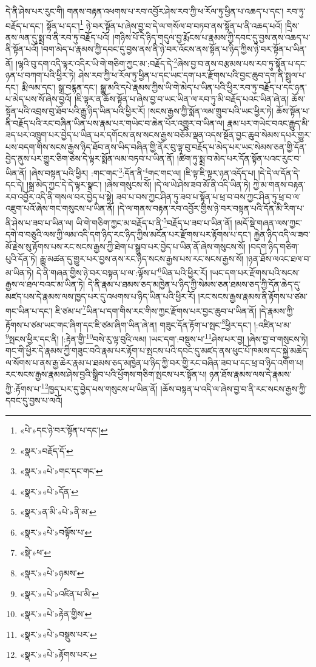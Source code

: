 དེ་ནི་ཤེས་པར་རུང་གི། གནས་བརྟན་འཕགས་པ་རབ་འབྱོར་ཤེས་རབ་ཀྱི་ཕ་རོལ་ཏུ་ཕྱིན་པ་འཆད་པ་དང་། རབ་ཏུ་བརྗོད་པ་དང་། སྟོན་པ་དང་།\footnote{«པེ་»དང་ཉེ་བར་སྟོན་པ་དང་།} ཉེ་བར་སྟོན་པ་ཞེས་བྱ་བ་དེ་ལ་གསོལ་བ་བཏབ་ནས་སྟོན་པ་ནི་འཆད་པའོ། །དྲིས་ནས་ལན་དུ་སྨྲ་བ་ནི་རབ་ཏུ་བརྗོད་པའོ། །གཉིས་པོ་དེ་ཉིད་གདུལ་བྱ་རྨོངས་པ་རྣམས་ཀྱི་དབང་དུ་བྱས་ནས་འཆད་པ་ནི་སྟོན་པའོ། །བག་མེད་པ་རྣམས་ཀྱི་དབང་དུ་བྱས་ནས་ནི་ཉེ་བར་འོངས་ནས་སྟོན་པ་ཉིད་ཀྱིས་ཉེ་བར་སྟོན་པ་ཡིན་ནོ། །ལྷའི་བུ་དག་འདི་ལྟར་འདིར་ཡི་གེ་གཅིག་ཀྱང་མ་:བརྗོད་དེ་\footnote{«སྣར་»བརྗོད་དོ་}ཞེས་བྱ་བ་ནས་བརྩམས་པས་རབ་ཏུ་སྟོན་པ་དང་ཉན་པ་བཀག་པའི་ཕྱིར་ཏེ། ཤེས་རབ་ཀྱི་ཕ་རོལ་ཏུ་ཕྱིན་པ་དང་ཡང་དག་པར་རྫོགས་པའི་བྱང་ཆུབ་དག་ནི་སྤྲུལ་པ་དང་། རྨི་ལམ་དང་། སྒྲ་བརྙན་དང་། སྒྱུ་མའི་དཔེ་རྣམས་ཀྱིས་ཡི་གེ་མེད་པ་ཡིན་པའི་ཕྱིར་རབ་ཏུ་བརྗོད་པ་དང་ཉན་པ་མེད་པས་སོ་ཞེས་བྱའོ། །ཇི་ལྟར་ན་ཆོས་སྟོན་པ་ཞེས་བྱ་བ་ཡང་ཡིན་ལ་རབ་ཏུ་མི་བརྗོད་པའང་ཡིན་ཞེ་ན། ཆོས་སྟོན་པའི་འབྲས་བུ་ཐོབ་པའི་རྒྱུ་ཉིད་ཡིན་པའི་ཕྱིར་རོ། །སངས་རྒྱས་ཀྱི་སྨོན་ལམ་གྲུབ་པའི་ཡང་ཕྱིར་ཏེ། ཆོས་སྟོན་པ་ནི་བརྗོད་པའི་རང་བཞིན་ཡིན་པས་རྣམ་པར་གཡེང་བ་ཆེན་པོར་འགྱུར་བ་ཡིན་ལ། རྣམ་པར་གཡེང་བའང་རྒྱུད་མི་ཟད་པར་འཁྲུག་པར་བྱེད་པ་ཡིན་པར་དགོངས་ནས་སངས་རྒྱས་བཅོམ་ལྡན་འདས་སྔོན་བྱང་ཆུབ་སེམས་དཔར་གྱུར་པས་བདག་གིས་སངས་རྒྱས་ཉིད་ཐོབ་ནས་ཡིད་བཞིན་གྱི་ནོར་བུ་ལྟ་བུ་བརྗོད་པ་མེད་པར་ཡང་སེམས་ཅན་གྱི་དོན་བྱེད་ནུས་པར་གྱུར་ཅིག་ཅེས་དེ་ལྟར་སྨོན་ལམ་བཏབ་པ་ཡིན་ནོ། །ཚིག་ཏུ་སྨྲ་བ་མེད་པར་དོན་སྟོན་པའང་རུང་བ་ཡིན་ནོ། །ཞེས་བསྟན་པའི་ཕྱིར། :གང་གང་\footnote{«སྣར་»«པེ་»གང་དང་གང་}:དོན་ནི་\footnote{«སྣར་»«པེ་»དོན་}གང་གང་ལ། །ཇི་ལྟ་ཇི་ལྟར་ཉན་འདོད་པ། །དེ་དེ་ལ་དོན་དེ་དང་དེ། །སྒྲ་མེད་ཀྱང་དེ་དེ་ལྟར་སྣང་། །ཞེས་གསུངས་སོ། །དེ་ལ་ཡེ་ཤེས་ཟབ་མོ་ནི་འདི་ཡིན་ཏེ། ཀྱེ་མ་གནས་བརྟན་རབ་འབྱོར་འདི་ནི་གསལ་བར་བྱེད་པ་སྟེ། ཟབ་པ་བས་ཀྱང་ཤིན་ཏུ་ཟབ་པ་སྟོན་པ་ཕྲ་བ་བས་ཀྱང་ཤིན་ཏུ་ཕྲ་བ་ལ་འཇུག་པའོ་ཞེས་གང་གསུངས་པ་ཡིན་ནོ། །དེ་ལ་གནས་བརྟན་རབ་འབྱོར་གྱིས་ཉེ་བར་བསྟན་པའི་དོན་མི་རིག་པ་ནི་ཤེས་པ་ཟབ་པ་ཡིན་ལ། ཡི་གེ་གཅིག་ཀྱང་མ་བརྗོད་པ་ནི་\footnote{«སྣར་»ན་མི་«པེ་»ནི་མ་}བརྗོད་པ་ཟབ་པ་ཡིན་ནོ། །མདོ་སྡེ་གཞན་ལས་ཀྱང་དགེ་བ་བཅུའི་ལས་ཀྱི་ལམ་འདི་དག་ཉིད་རང་ཉིད་ཀྱིས་མངོན་པར་རྫོགས་པར་རྟོགས་པ་དང་། རྐྱེན་ཉིད་འདི་ལ་ཟབ་མོ་རྗེས་སུ་རྟོགས་པས་རང་སངས་རྒྱས་ཀྱི་ཐེག་པ་སྒྲུབ་པར་བྱེད་པ་ཡིན་ནོ་ཞེས་གསུངས་སོ། །བདག་ཉིད་གཅིག་པུའི་དོན་ཏེ། རྒྱུ་མཚན་དུ་གྱུར་པར་བྱས་ནས་རང་ཉིད་སངས་རྒྱས་པས་རང་སངས་རྒྱས་སོ། །ཉན་ཐོས་ལའང་ཐལ་བ་མ་ཡིན་ཏེ། དེ་ནི་གཞན་གྱིས་ཉེ་བར་བསྟན་པ་ལ་:ལྟོས་པ་\footnote{«སྣར་»«པེ་»བལྟོས་པ་}ཡིན་པའི་ཕྱིར་རོ། །ཡང་དག་པར་རྫོགས་པའི་སངས་རྒྱས་ལ་ཐལ་བའང་མ་ཡིན་ཏེ། དེ་ནི་རྣམ་པ་ཐམས་ཅད་མཁྱེན་པ་ཉིད་ཀྱི་སེམས་ཅན་ཐམས་ཅད་ཀྱི་དོན་ཆེད་དུ་མཛད་པས་དེ་རྣམས་ལས་ཁྱད་པར་དུ་འཕགས་པ་ཉིད་ཡིན་པའི་ཕྱིར་རོ། །རང་སངས་རྒྱས་རྣམས་ནི་རྟོགས་པ་ཙམ་གང་ཡིན་པ་དང་། ཇི་ཙམ་པ་\footnote{«སྡེ་»ཕ་}ཡིན་པ་དག་གིས་རང་གིས་ཀྱང་རྫོགས་པར་བྱང་ཆུབ་པ་ཡིན་ནོ། །དེ་རྣམས་ཀྱི་རྟོགས་པ་ཙམ་ཡང་གང་ཞིག་དང་ཇི་ཙམ་ཞིག་ཡིན་ཞེ་ན། གཟུང་དོན་རྟོག་པ་སྤང་\footnote{«སྣར་»«པེ་»ཉམས་}ཕྱིར་དང་། །:འཛིན་པ་མ་\footnote{«སྣར་»«པེ་»འཛིན་པ་མི་}སྤངས་ཕྱིར་དང་ནི། །:རྟེན་གྱི་\footnote{«སྣར་»«པེ་»རྟེན་གྱིས་}བསེ་རུ་ལྟ་བུའི་ལམ། །ཡང་དག་:བསྡུས་པ་\footnote{«སྣར་»«པེ་»བསྡུས་པར་}ཤེས་པར་བྱ། །ཞེས་བྱ་བ་གསུངས་ཏེ། གང་གི་ཕྱིར་དེ་རྣམས་ཀྱི་གཟུང་བའི་རྣམ་པར་རྟོག་པ་སྤངས་པའི་དབང་དུ་མཛད་ནས་ཕུང་པོ་ཁམས་དང་སྐྱེ་མཆེད་ལ་སོགས་པ་ནས་རྒྱ་ཆེར་རྣམ་པ་ཐམས་ཅད་མཁྱེན་པ་ཉིད་ཀྱི་བར་གྱི་རང་བཞིན་ཟབ་པ་དང་ཕྲ་བ་ཉིད་འགོག་པ། རང་སངས་རྒྱས་རྣམས་ཤེས་བྱའི་སྒྲིབ་པའི་ཕྱོགས་གཅིག་སྤངས་པར་སྟོན་པ། ཉན་ཐོས་རྣམས་ལས་དེ་རྣམས་ཀྱི་:རྟོགས་པ་\footnote{«སྣར་»«པེ་»རྟོགས་པར་}ཁྱད་པར་དུ་བྱེད་པས་གསུངས་པ་ཡིན་ནོ། །ཆོས་བསྟན་པ་འདི་ལ་ཞེས་བྱ་བ་ནི་རང་སངས་རྒྱས་ཀྱི་དབང་དུ་བྱས་པ་ལའོ། 